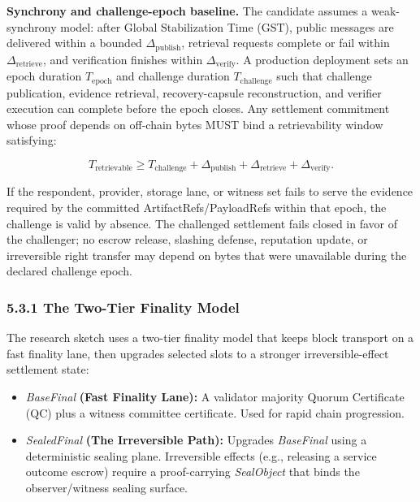 \documentclass[
  11pt,
]{article}
\providecommand{\tightlist}{%
  \setlength{\itemsep}{0pt}\setlength{\parskip}{0pt}}
\begin{document}
\textbf{Synchrony and challenge-epoch baseline.} The candidate assumes a
weak-synchrony model: after Global Stabilization Time (GST), public messages are delivered
within a bounded \(\Delta_{\mathrm{publish}}\), retrieval requests
complete or fail within \(\Delta_{\mathrm{retrieve}}\), and verification
finishes within \(\Delta_{\mathrm{verify}}\). A production deployment
sets an epoch duration \(T_{\mathrm{epoch}}\) and challenge duration
\(T_{\mathrm{challenge}}\) such that challenge publication, evidence
retrieval, recovery-capsule reconstruction, and verifier execution can
complete before the epoch closes. Any settlement commitment whose proof
depends on off-chain bytes MUST bind a retrievability window satisfying:

\[
T_{\mathrm{retrievable}} \geq
T_{\mathrm{challenge}} + \Delta_{\mathrm{publish}} +
\Delta_{\mathrm{retrieve}} + \Delta_{\mathrm{verify}}.
\]

If the respondent, provider, storage lane, or witness set fails to serve
the evidence required by the committed ArtifactRefs/PayloadRefs within
that epoch, the challenge is valid by absence. The challenged settlement
fails closed in favor of the challenger; no escrow release, slashing
defense, reputation update, or irreversible right transfer may depend on
bytes that were unavailable during the declared challenge epoch.

\hypertarget{the-two-tier-finality-model}{%
\subsubsection{5.3.1 The Two-Tier Finality
Model}\label{the-two-tier-finality-model}}

The research sketch uses a two-tier finality model that keeps block
transport on a fast finality lane, then upgrades selected slots to a stronger
irreversible-effect settlement state:

\begin{itemize}
\tightlist
\item
  \emph{BaseFinal}\textbf{ (Fast Finality Lane):} A validator majority Quorum
  Certificate (QC) plus a witness committee certificate. Used for rapid
  chain progression.
\item
  \emph{SealedFinal}\textbf{ (The Irreversible Path):} Upgrades
  \emph{BaseFinal} using a deterministic sealing plane. Irreversible
  effects (e.g., releasing a service outcome escrow) require a
  proof-carrying \emph{SealObject} that binds the observer/witness
  sealing surface.
\end{itemize}
\end{document}
